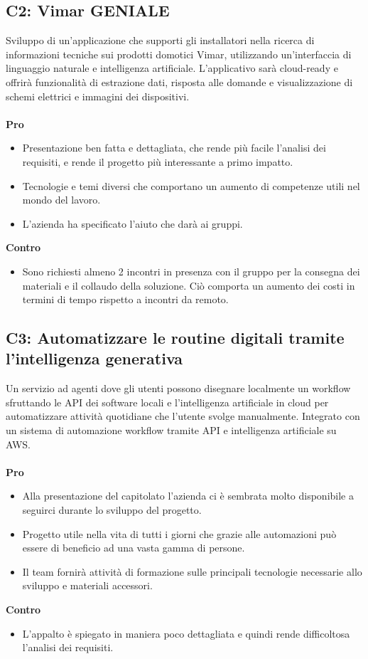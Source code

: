 \subsection{C2: Vimar GENIALE}
Sviluppo di un'applicazione che supporti gli installatori nella ricerca di informazioni tecniche sui prodotti domotici Vimar, utilizzando un'interfaccia di linguaggio naturale e intelligenza artificiale. L'applicativo sarà cloud-ready e offrirà funzionalità di estrazione dati, risposta alle domande e visualizzazione di schemi elettrici e immagini dei dispositivi.\\\\
\textbf{Pro}
\begin{itemize}
    \item Presentazione ben fatta e dettagliata, che rende più facile l'analisi dei requisiti, e rende il progetto più interessante a primo impatto.
    \item Tecnologie e temi diversi che comportano un aumento di competenze utili nel mondo del lavoro.
    \item L'azienda ha specificato l'aiuto che darà ai gruppi.
\end{itemize}
\textbf{Contro}
\begin{itemize}
    \item Sono richiesti almeno 2 incontri in presenza con il gruppo per la consegna dei materiali e il
    collaudo della soluzione. Ciò comporta un aumento dei costi in termini di tempo rispetto a incontri da remoto.
\end{itemize}

\subsection{C3: Automatizzare le routine digitali tramite l’intelligenza generativa}
Un servizio ad agenti dove gli utenti possono disegnare
localmente un workflow sfruttando le API dei software
locali e l’intelligenza artificiale in cloud per automatizzare
attività quotidiane che l’utente svolge manualmente.  Integrato con un sistema di automazione workflow tramite API e intelligenza artificiale su AWS. \\\\
\textbf{Pro}
\begin{itemize}
    \item Alla presentazione del capitolato l'azienda ci è sembrata molto disponibile a seguirci durante lo sviluppo del progetto.
    \item Progetto utile nella vita di tutti i giorni che grazie alle automazioni può essere di beneficio ad una vasta gamma di persone.
    \item Il team fornirà attività di formazione sulle principali tecnologie necessarie allo sviluppo e materiali accessori.
\end{itemize}
\textbf{Contro}
\begin{itemize}
    \item L'appalto è spiegato in maniera poco dettagliata e quindi rende difficoltosa l'analisi dei requisiti.
\end{itemize}


